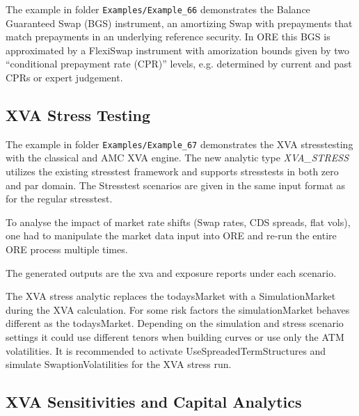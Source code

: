 The example in folder {\tt Examples/Example\_66} demonstrates the
Balance Guaranteed Swap (BGS) instrument, an amortizing Swap with prepayments
that match prepayments in an underlying reference security. In ORE this
BGS is approximated by a FlexiSwap instrument with amorization bounds
given by two ``conditional prepayment rate (CPR)'' levels, e.g. determined by
current and past CPRs or expert judgement.

\subsection{XVA Stress Testing}%
\label{example:67}

The example in folder {\tt Examples/Example\_67} demonstrates the XVA stresstesting with the classical and AMC XVA engine.
The new analytic type \emph{XVA\_STRESS} utilizes the existing stresstest framework and supports stresstests in both zero and par domain.
The Stresstest scenarios are given in the same input format as for the regular stresstest.

To analyse the impact of market rate shifts (Swap rates, CDS spreads, flat vols), one had to
manipulate the market data input into ORE and re-run the entire ORE process multiple times.

The generated outputs are the xva and exposure reports under each scenario.

The XVA stress analytic replaces the todaysMarket with a SimulationMarket during the XVA calculation. For some risk factors the simulationMarket behaves
different as the todaysMarket. Depending on the simulation and stress scenario settings it could use different tenors when building curves
or use only the ATM volatilities. It is recommended to activate UseSpreadedTermStructures and simulate SwaptionVolatilities for the
XVA stress run.

\subsection{XVA Sensitivities and Capital Analytics}%
\label{example:68}

